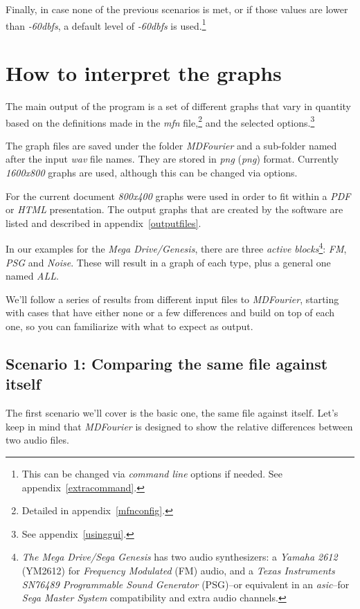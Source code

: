 \documentclass[10pt,a4paper]{report}
\newcommand{\define}[1]{\textit{\acrlong{#1}} (\textit{\acrshort{#1}})}
\newcommand{\ac}[1]{\textit{\mbox{\acrshort{#1}}}}
\newcommand{\db}[1]{\textit{\mbox{#1\acrshort{dbfs}}}}
\begin{document}
Finally, in case none of the previous scenarios is met, or if those values are lower than \db{-60}, a default level of \db{-60} is used.\footnote{This can be changed via \textit{command line} options if needed. See appendix~\ref{extracommand}.}

\chapter{How to interpret the graphs}
\label{howtographs}

The main output of the program is a set of different graphs that vary in quantity based on the definitions made in the \textit{mfn} file,\footnote{Detailed in appendix~\ref{mfnconfig}.} and the selected options.\footnote{See appendix~\ref{usinggui}.}

The graph files are saved under the folder \textit{MDFourier} and a sub-folder named after the input \ac{wav} file names. They are stored in \define{png} format. Currently \textit{1600x800} graphs are used, although this can be changed via options. 

For the current document \textit{800x400} graphs were used in order to fit within a \textit{PDF} or \textit{HTML} presentation. The output graphs that are created by the software are listed and described in appendix~\ref{outputfiles}.

In our examples for the \textit{Mega Drive/Genesis}, there are three \textit{active blocks}\footnote{\textit{The Mega Drive/Sega Genesis} has two audio synthesizers: a \textit{Yamaha 2612} (YM2612) for \textit{Frequency Modulated} (FM) audio, and a \textit{Texas Instruments SN76489 Programmable Sound Generator} (PSG)--or equivalent in an \ac{asic}--for \textit{Sega Master System} compatibility and extra audio channels.}: \textit{FM}, \textit{PSG} and \textit{Noise}. These will result in a graph of each type, plus a general one named \textit{ALL}.

We'll follow a series of results from different input files to \textit{MDFourier}, starting with cases that have either none or a few differences and build on top of each one, so you can familiarize with what to expect as output.

\section{Scenario 1: Comparing the same file against itself}
\label{scenario1}

The first scenario we'll cover is the basic one, the same file against itself. Let's keep in mind that \textit{MDFourier} is designed to show the relative differences between two audio files.
\end{document}

